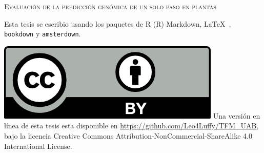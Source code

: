 \documentclass[11pt,spanish,a4paper,oneside,]{book} %
\begin{document}
\frontmatter
\thispagestyle{empty}
\def\drop{.1\textheight}

\vspace*{\drop}
\begin{center}
\Huge \textsc{Evaluación de la predicción genómica de un solo paso en plantas}
\end{center}

\clearpage
\thispagestyle{empty}
\vspace*{\fill}
\begingroup %
\small
\setlength{\parskip}{\baselineskip} %
\setlength\parindent{0pt} %

Esta tesis se escribio usando los paquetes de R (R) Markdown, \LaTeX\ , \verb+bookdown+  y \verb+amsterdown+.

\vspace{\baselineskip}
\includegraphics{_bookdown_files/CC-BY.png} \newline
Una versión en línea de esta tesis esta disponible en 
\url{https://github.com/Leo4Luffy/TFM_UAB},
bajo la licencia Creative Commons Attribution-NonCommercial-ShareAlike 4.0 International License.
\endgroup
\end{document}
